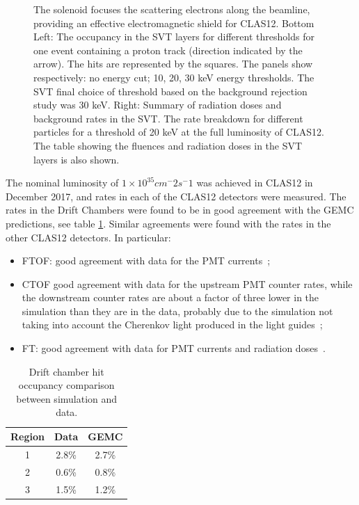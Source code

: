\begin{figure}[h]
{        The solenoid focuses the scattering electrons along the beamline, providing an effective
        electromagnetic shield for CLAS12.
        Bottom Left: The occupancy in the SVT layers for different thresholds for
        one event containing a proton track (direction indicated by the arrow).
        The hits are represented by the squares. The panels show respectively:
        no energy cut; 10, 20, 30 keV energy thresholds.
        The SVT final choice of threshold based on the background rejection study was 30 keV.
        Right: Summary of radiation doses and background rates in the SVT.
        The rate breakdown for different particles for a threshold of 20 keV
        at the full luminosity of CLAS12.
        The table showing the fluences and radiation doses in the SVT layers is also shown.}
    \label{fig:clas12_rates}

\end{figure}

The nominal luminosity of $1 \times 10^35 cm^-2 s^-1$ was achieved in CLAS12 in
December 2017, and rates in each of the CLAS12 detectors were measured.
The rates in the Drift Chambers were found to be in good agreement with the GEMC predictions, see
table \ref{tab:rates}. Similar agreements were found with the rates in the other CLAS12 detectors. In particular:

\begin{itemize}
    \item FTOF: good agreement with data for the PMT currents~\cite{ftof-nim};
    \item CTOF good agreement with data for the upstream PMT counter rates, while the downstream counter rates
    are about a factor of three lower in the simulation than they are in the data, probably due to the simulation
    not taking into account the Cherenkov light produced in the light guides~\cite{ctof-nim};
    \item FT: good agreement with data for PMT currents and radiation doses~\cite{ft-nim}.
\end{itemize}

\begin{table}[h]
    \begin{center}
        \begin{tabular}{| c | c | c |}
            \hline \hline
            Region & Data  & GEMC  \\
            \hline
            1         & 2.8\% & 2.7\% \\
            2         & 0.6\% & 0.8\% \\
            3         & 1.5\% & 1.2\% \\
            \hline \hline
        \end{tabular}
    \end{center}
    \caption{Drift chamber hit occupancy comparison between simulation and data.}
    \label{tab:rates}
\end{table}

